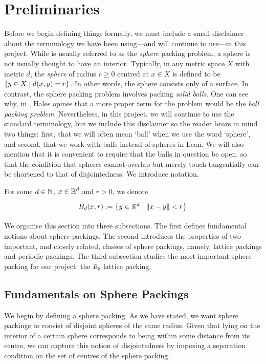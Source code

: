 \section{Preliminaries}

Before we begin defining things formally, we must include a small disclaimer about the terminology we have been using---and will continue to use---in this project. While  is usually referred to as the \textit{sphere} packing problem, a sphere is not usually thought to have an interior. Typically, in any metric space $X$ with metric $d$, the \textit{sphere} of radius $r \geq 0$ centred at $x \in X$ is defined to be $\left\{ y \in X \; \middle\vert \; d(x, y) = r \right\}$. In other words, the sphere consists only of a surface. In contrast, the sphere packing problem involves packing \textit{solid balls}. One can see why, in \cite{CannonHoney}, Hales opines that a more proper term for the problem would be the \textit{ball packing problem}. Nevertheless, in this project, we will continue to use the standard terminology, but we include this disclaimer so the reader bears in mind two things: first, that we will often mean `ball' when we use the word `sphere', and second, that we work with balls instead of spheres in Lean. We will also mention that it is convenient to require that the balls in question be open, so that the condition that spheres cannot overlap but merely touch tangentially can be shortened to that of disjointedness. We introduce notation.

\begin{boxnotation}
    For some $d \in \mathbb{N}$, $x \in \mathbb{R}^d$ and $r > 0$, we denote
    \begin{align*}
        B_d(x, r) := \left\{ y \in \mathbb{R}^d \; \middle\vert \; \left\lVert x - y \right\rVert < r \right\}
    \end{align*}
\end{boxnotation}

We organise this section into three subsections. The first defines fundamental notions about sphere packings. The second introduces the properties of two important, and closely related, classes of sphere packings, namely, lattice packings and periodic packings. The third subsection studies the most important sphere packing for our project: the $E_8$ lattice packing.

\subsection{Fundamentals on Sphere Packings}

We begin by defining a sphere packing. As we have stated, we want sphere packings to consist of disjoint spheres of the same radius. Given that lying on the interior of a certain sphere corresponds to being within some distance from its centre, we can capture this notion of disjointedness by imposing a separation condition on the set of centres of the sphere packing.

